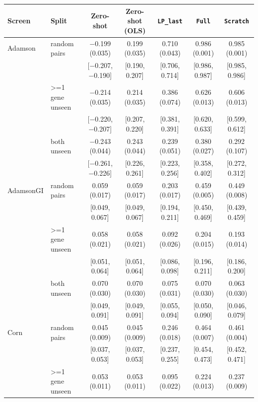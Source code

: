 \begin{tabular}{ll|ccccc}
\hline
Screen & Split & Zero-shot & Zero-shot (OLS) & \texttt{LP\_last} & \texttt{Full} & \texttt{Scratch} \\
\hline
Adamson & random pairs & $-$0.199 (0.035) & 0.199 (0.035) & 0.710 (0.043) & 0.986 (0.001) & 0.985 (0.001) \\
 & & \scriptsize[$-$0.207, $-$0.190] & \scriptsize[0.190, 0.207] & \scriptsize[0.706, 0.714] & \scriptsize[0.986, 0.987] & \scriptsize[0.985, 0.986] \\
 & >=1 gene unseen & $-$0.214 (0.035) & 0.214 (0.035) & 0.386 (0.074) & 0.626 (0.013) & 0.606 (0.013) \\
 & & \scriptsize[$-$0.220, $-$0.207] & \scriptsize[0.207, 0.220] & \scriptsize[0.381, 0.391] & \scriptsize[0.620, 0.633] & \scriptsize[0.599, 0.612] \\
 & both unseen & $-$0.243 (0.044) & 0.243 (0.044) & 0.239 (0.051) & 0.380 (0.027) & 0.292 (0.107) \\
 & & \scriptsize[$-$0.261, $-$0.226] & \scriptsize[0.226, 0.261] & \scriptsize[0.223, 0.256] & \scriptsize[0.358, 0.402] & \scriptsize[0.272, 0.312] \\
\hline
AdamsonGI & random pairs & 0.059 (0.017) & 0.059 (0.017) & 0.203 (0.017) & 0.459 (0.005) & 0.449 (0.008) \\
 & & \scriptsize[0.049, 0.067] & \scriptsize[0.049, 0.067] & \scriptsize[0.194, 0.211] & \scriptsize[0.450, 0.469] & \scriptsize[0.439, 0.459] \\
 & >=1 gene unseen & 0.058 (0.021) & 0.058 (0.021) & 0.092 (0.026) & 0.204 (0.015) & 0.193 (0.014) \\
 & & \scriptsize[0.051, 0.064] & \scriptsize[0.051, 0.064] & \scriptsize[0.086, 0.098] & \scriptsize[0.196, 0.211] & \scriptsize[0.186, 0.200] \\
 & both unseen & 0.070 (0.030) & 0.070 (0.030) & 0.075 (0.031) & 0.070 (0.030) & 0.063 (0.030) \\
 & & \scriptsize[0.049, 0.091] & \scriptsize[0.049, 0.091] & \scriptsize[0.055, 0.094] & \scriptsize[0.050, 0.090] & \scriptsize[0.046, 0.079] \\
\hline
Corn & random pairs & 0.045 (0.009) & 0.045 (0.009) & 0.246 (0.018) & 0.464 (0.007) & 0.461 (0.004) \\
 & & \scriptsize[0.037, 0.053] & \scriptsize[0.037, 0.053] & \scriptsize[0.237, 0.255] & \scriptsize[0.454, 0.473] & \scriptsize[0.452, 0.471] \\
 & >=1 gene unseen & 0.053 (0.011) & 0.053 (0.011) & 0.095 (0.022) & 0.224 (0.013) & 0.237 (0.009) \\

\end{tabular}
